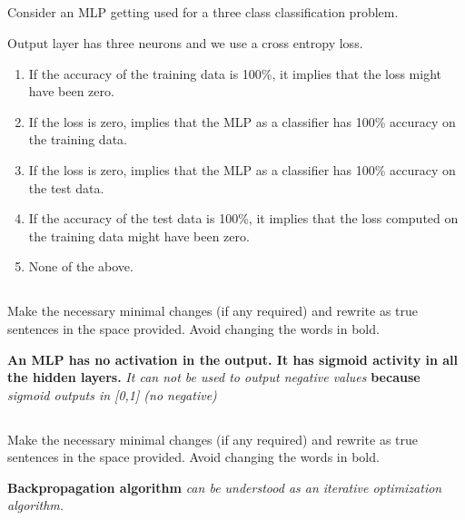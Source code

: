 \begin{frame}
\section{}
Consider an MLP getting used for a three class classification problem.

Output layer has three neurons and we use a cross entropy loss.
\begin{enumerate}[label=(\Alph*)]
\item If the accuracy of the training data is 100\%, it implies that the loss might have been zero.
\item If the loss is zero, implies that the MLP as a classifier has 100\% accuracy on the training data.    %
\item If the loss is zero, implies that the MLP as a classifier has 100\% accuracy on the test data.
\item If the accuracy of the test data is 100\%, it implies that the loss computed on the training data might  have been zero.
\item None of the above.  %
\end{enumerate}
\end{frame}


\begin{frame}
\section{}
Make the necessary minimal changes  (if any required) and rewrite as true sentences in the space provided. Avoid changing the words in bold.

{\bf An MLP  has no activation in the  output. It has  sigmoid activity in all the hidden layers.  }{\em It can not be used to output negative values} {\bf because }{\em  sigmoid outputs in [0,1] (no negative)}
\end{frame}

\begin{frame}
\section{}
Make the necessary minimal changes  (if any required) and rewrite as true sentences in the space provided. Avoid changing the words in bold.

{\bf Backpropagation algorithm } {\em can be understood as an iterative optimization algorithm.}

\end{frame}
